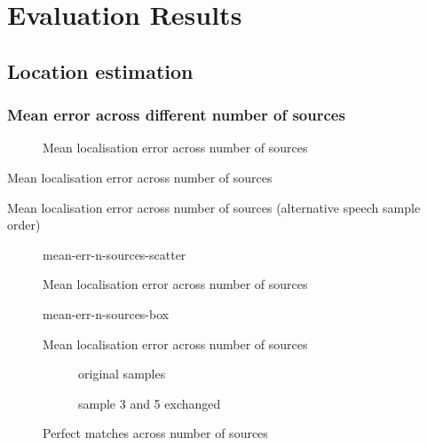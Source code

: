 \chapter{Evaluation Results}
\label{chap:results}

\section{Location estimation}
\subsection*{Mean error across different number of sources}

\begin{figure}[H]
	\centering
		
	\caption{Mean localisation error across number of sources}
\end{figure}

\begin{table}[H]
	\centering
	
	\caption{Mean localisation error across number of sources}
\end{table}

\begin{table}[H]
	\centering
	
	\caption{Mean localisation error across number of sources (alternative speech sample order)}
\end{table}


\begin{figure}[H]
	\centering
	{mean-err-n-sources-scatter}
	\caption{Mean localisation error across number of sources}
\end{figure}

\begin{figure}[H]
	\centering
	{mean-err-n-sources-box}
	\caption{Mean localisation error across number of sources}
\end{figure}

\begin{figure}[H]
	\centering
	\begin{subfigure}{0.49\textwidth}
		\centering
			
		\caption{original samples}
	\end{subfigure}
	\begin{subfigure}{0.49\textwidth}
		\centering
			
		\caption{sample 3 and 5 exchanged}
	\end{subfigure}
	\caption{Perfect matches across number of sources}
	\label{fig:perfect}
\end{figure}

